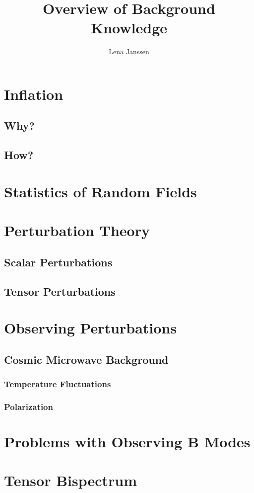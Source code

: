 \documentclass[12pt]{article}
\title{Overview of Background Knowledge}
\author{Lena Janssen}
\date{}
\begin{document}
\maketitle

\hypersetup{linkcolor=black}
\tableofcontents

\section{Inflation}
\subsection{Why?}
\subsection{How?}

\section{Statistics of Random Fields}


\section{Perturbation Theory}

\subsection{Scalar Perturbations}

\subsection{Tensor Perturbations}

\section{Observing Perturbations}

\subsection{Cosmic Microwave Background}

\subsubsection{Temperature Fluctuations}
\subsubsection{Polarization}

\section{Problems with Observing B Modes}

\section{Tensor Bispectrum}
\end{document}
